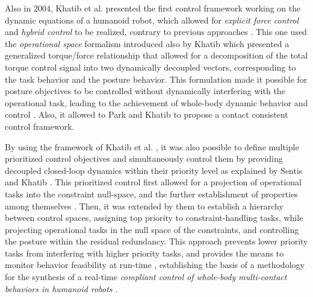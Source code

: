 	Also in 2004, Khatib et al. \cite{Khatib_IJHR2004} presented the first control framework working on the
	dynamic equations of a humanoid robot, which allowed for \emph{explicit force control} and
	\emph{hybrid control} to be realized, contrary to previous approaches \cite{DelPrete_PhDThesis2013}.
	This one used the \emph{operational space} formalism introduced also by Khatib
	\cite{Khatib_RoboticsAuto1987} which presented a generalized torque/force relationship that
	allowed for a	decomposition of the total torque control signal into two dynamically decoupled
	vectors, corresponding to the task behavior and the posture behavior.
	This formulation made it possible for posture objectives to be controlled without dynamically
	interfering with the operational task, leading to the achievement of whole-body dynamic behavior
	and control	\cite{Khatib_IJHR2004}.
	Also, it allowed to Park and Khatib \cite{Park_ICRA2006} \cite{Park_Robotica2008} to propose a contact
	consistent control framework.
	
	By using the framework of Khatib et al. \cite{Khatib_IJHR2004}, it was also possible to define multiple
	prioritized control objectives and simultaneously control them by providing decoupled closed-loop
	dynamics within their	priority level as explained by Sentis and Khatib \cite{Sentis_IJHR2004}
	\cite{Sentis_ICRA2005} \cite{Sentis_IJHR2005}.
	This prioritized control first allowed for a projection of operational tasks into the constraint
	null-space, and the further establishment of properties among themselves \cite{Sentis_IJHR2005}.
	Then, it was extended by them \cite{Sentis_ICRA2006} to establish a hierarchy between control
	spaces,	assigning top priority to	constraint-handling tasks, while projecting operational tasks
	in the null space of the constraints, and controlling the posture	within the residual redundancy.
	This approach prevents lower priority tasks from interfering with higher priority tasks,
	and provides the means to monitor behavior feasibility at run-time \cite{Sentis_ICRA2006},
	establishing the basis of a methodology for the synthesis of a real-time
	\emph{compliant control of whole-body multi-contact behaviors in humanoid robots}
	\cite{Sentis_PhDThesis2007} \cite{Sentis_MotionPlan2010}.
	
